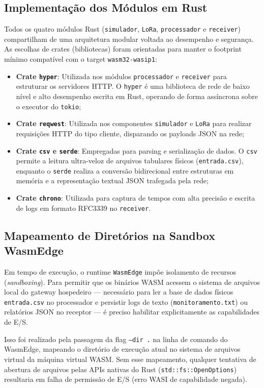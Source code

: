 \documentclass[
	12pt,
	openright,
	oneside,
	a4paper,
	english,
	brazil
	]{abntex2}
\begin{document}
\subsection{Implementação dos Módulos em Rust}
Todos os quatro módulos Rust (\texttt{simulador}, \texttt{LoRa}, \texttt{processador} e \texttt{receiver}) compartilham de uma arquitetura modular voltada ao desempenho e segurança. As escolhas de crates (bibliotecas) foram orientadas para manter o footprint mínimo compatível com o target \texttt{wasm32-wasip1}:
\begin{itemize}
    \item \textbf{Crate \texttt{hyper}}: Utilizada nos módulos \texttt{processador} e \texttt{receiver} para estruturar os servidores HTTP. O \texttt{hyper} é uma biblioteca de rede de baixo nível e alto desempenho escrita em Rust, operando de forma assíncrona sobre o executor do \texttt{tokio};
    \item \textbf{Crate \texttt{reqwest}}: Utilizada nos componentes \texttt{simulador} e \texttt{LoRa} para realizar requisições HTTP do tipo cliente, disparando os payloads JSON na rede;
    \item \textbf{Crate \texttt{csv} e \texttt{serde}}: Empregadas para parsing e serialização de dados. O \texttt{csv} permite a leitura ultra-veloz de arquivos tabulares físicos (\texttt{entrada.csv}), enquanto o \texttt{serde} realiza a conversão bidirecional entre estruturas em memória e a representação textual JSON trafegada pela rede;
    \item \textbf{Crate \texttt{chrono}}: Utilizada para captura de tempos com alta precisão e escrita de logs em formato RFC3339 no \texttt{receiver}.
\end{itemize}

\subsection{Mapeamento de Diretórios na Sandbox WasmEdge}
Em tempo de execução, o runtime \texttt{WasmEdge} impõe isolamento de recursos (\textit{sandboxing}). Para permitir que os binários WASM acessem o sistema de arquivos local do gateway hospedeiro — necessário para ler a base de dados físicos \texttt{entrada.csv} no processador e persistir logs de texto (\texttt{monitoramento.txt}) ou relatórios JSON no receptor — é preciso habilitar explicitamente as capabilidades de E/S.

Isso foi realizado pela passagem da flag \texttt{--dir .} na linha de comando do WasmEdge, mapeando o diretório de execução atual no sistema de arquivos virtual da máquina virtual WASM. Sem esse mapeamento, qualquer tentativa de abertura de arquivos pelas APIs nativas do Rust (\texttt{std::fs::OpenOptions}) resultaria em falha de permissão de E/S (erro WASI de capabilidade negada).
\end{document}
